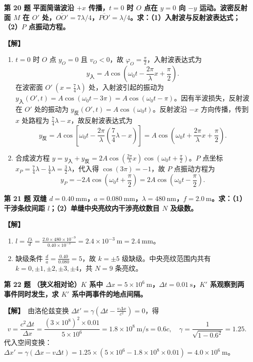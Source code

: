 \documentclass[zihao=5,a4paper,UTF8]{ctexart}
\newenvironment{prob}[2]{%
    \par\vspace{5pt}\noindent\textbf{\color{navy}#1} \textbf{#2}\par\nopagebreak\vspace{2pt}%
}{%
    \par\vspace{3pt}%
}
\newcommand{\sol}{\noindent\textbf{\color{tealaccent}【解】}\ }
\begin{document}
\begin{prob}{第 20 题}{平面简谐波沿 $+x$ 传播，$t=0$ 时 $O$ 点在 $y=0$ 向 $-y$ 运动。波密反射面 $M$ 在 $O'$ 处，$\overline{OO'} = 7\lambda/4$，$\overline{PO'} = \lambda/4$。求：（1）入射波与反射波表达式；（2）$P$ 点振动方程。}
\sol
\begin{enumerate}[leftmargin=2em, itemsep=2pt]
    \item $t=0$ 时 $O$ 点 $y_O=0$ 且 $v_O < 0$，故 $\varphi_O = \frac{\pi}{2}$，入射波表达式为
    \[
        y_{\text{入}} = A\cos\left(\omega_0 t - \frac{2\pi}{\lambda}x + \frac{\pi}{2}\right).
    \]
    在波密面 $O'\ (x = \frac{7}{4}\lambda)$ 处，入射波引起的振动为 $y_{\text{入}}(O',t) = A\cos\left(\omega_0 t - 3\pi\right) = A\cos(\omega_0 t - \pi)$。因有半波损失，反射波在 $O'$ 处的振动为 $y_{\text{反}}(O',t) = A\cos(\omega_0 t)$。反射波沿 $-x$ 方向传播，传到 $x$ 处路程为 $\frac{7}{4}\lambda - x$，故反射波表达式为
    \[
        y_{\text{反}} = A\cos\left[\omega_0 t - \frac{2\pi}{\lambda}\left(\frac{7}{4}\lambda - x\right)\right] = A\cos\left(\omega_0 t + \frac{2\pi}{\lambda}x + \frac{\pi}{2}\right).
    \]
    \item 合成波方程 $y = y_{\text{入}} + y_{\text{反}} = 2A\cos\left(\frac{2\pi}{\lambda}x\right)\cos\left(\omega_0 t + \frac{\pi}{2}\right)$。$P$ 点坐标 $x_P = \frac{7}{4}\lambda - \frac{1}{4}\lambda = \frac{3}{2}\lambda$，代入得 $\cos(3\pi) = -1$，故 $P$ 点振动方程为
    \[
        y_P = -2A\cos\left(\omega_0 t + \frac{\pi}{2}\right) = 2A\cos\left(\omega_0 t - \frac{\pi}{2}\right).
    \]
\end{enumerate}
\end{prob}

\begin{prob}{第 21 题}{双缝 $d=0.40\ \mathrm{mm}$，$a=0.080\ \mathrm{mm}$，$\lambda=480\ \mathrm{nm}$，$f=2.0\ \mathrm{m}$。求：（1）干涉条纹间距 $l$；（2）单缝中央亮纹内干涉亮纹数目 $N$ 及级数。}
\sol
\begin{enumerate}[leftmargin=2em, itemsep=2pt]
    \item $l = \frac{f\lambda}{d} = \frac{2.0\times 480\times 10^{-9}}{0.40\times 10^{-3}} = 2.4\times 10^{-3}\ \mathrm{m} = 2.4\ \mathrm{mm}$。
    \item 缺级条件 $\frac{d}{a} = \frac{0.40}{0.080} = 5$，故 $k = \pm 5$ 级缺级。中央亮纹范围内共有 $k = 0, \pm 1, \pm 2, \pm 3, \pm 4$，共 $N = 9$ 条亮纹。
\end{enumerate}
\end{prob}

\begin{prob}{第 22 题}{（狭义相对论）$K$ 系中 $\Delta x = 5\times 10^6\ \mathrm{m}$，$\Delta t = 0.01\ \mathrm{s}$，$K'$ 系观察到两事件同时发生，求 $K'$ 系中两事件的地点间隔。}
\sol 由洛伦兹变换 $\Delta t' = \gamma\left(\Delta t - \frac{v\Delta x}{c^2}\right) = 0$，得
\[
    v = \frac{c^2\Delta t}{\Delta x} = \frac{(3\times 10^8)^2\times 0.01}{5\times 10^6} = 1.8\times 10^8\ \mathrm{m/s} = 0.6c,\quad \gamma = \frac{1}{\sqrt{1 - 0.6^2}} = 1.25.
\]
代入空间变换：$\Delta x' = \gamma(\Delta x - v\Delta t) = 1.25\times (5\times 10^6 - 1.8\times 10^8\times 0.01) = 4.0\times 10^6\ \mathrm{m}$。
\end{prob}
\end{document}
